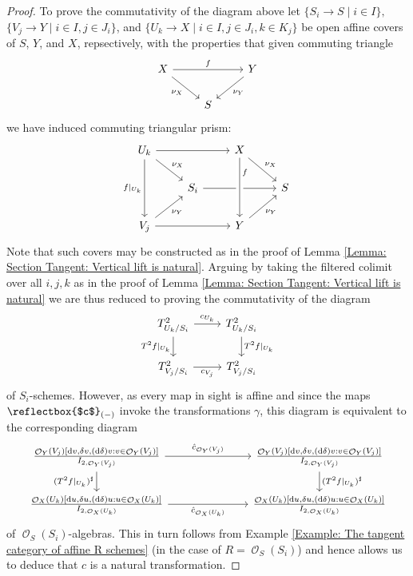 \documentclass{amsart}
\theoremstyle{definition}
\DeclareMathOperator{\Ocal}{\mathcal{O}}
\numberwithin{equation}{subsection}
\begin{document}
\begin{proof}
To prove the commutativity of the diagram above let $\lbrace S_i \to S \; | \; i \in I \rbrace,$ $\lbrace V_j \to Y \; | \; i \in I, j \in J_i\rbrace$, and $\lbrace U_k \to X \; | \; i \in I, j \in J_i, k \in K_j \rbrace$ be open affine covers of $S$, $Y$, and $X$, repsectively, with the properties that given commuting triangle
\[
\begin{tikzcd}
X \ar[rr]{}{f} \ar[dr, swap]{}{\nu_X} & & Y \ar[dl]{}{\nu_Y} \\
 & S
\end{tikzcd}
\]
we have induced commuting triangular prism:
\[
\begin{tikzcd}
	U_k \ar[dr]{}{\nu_X} \ar[rr] \ar[dd, swap]{}{f|_{U_k}} & & X  \ar[dr]{}{\nu_X} \\
	& S_i \ar[rr] & & S \\
	V_j \ar[rr] \ar[ur, swap]{}{\nu_Y} & & Y \ar[ur, swap]{}{\nu_Y}
	\ar[from = 1-3, to = 3-3, crossing over, near start]{}{f}
\end{tikzcd}
\]
Note that such covers may be constructed as in the proof of Lemma \ref{Lemma: Section Tangent: Vertical lift is natural}. Arguing by taking the filtered colimit over all $i, j, k$ as in the proof of Lemma \ref{Lemma: Section Tangent: Vertical lift is natural} we are thus reduced to proving the commutativity of the diagram
\[
\begin{tikzcd}
	T^{2}_{U_k/S_i} \ar[r]{}{c_{U_k}} \ar[d, swap]{}{T^2f|_{U_k}} & T^{2}_{U_k/S_i} \ar[d]{}{T^2f|_{U_k}} \\
	T^{2}_{V_j/S_i} \ar[r, swap]{}{c_{V_j}} & T^{2}_{V_j/S_i}
\end{tikzcd}
\]
of $S_i$-schemes. However, as every map in sight is affine and since the maps $\reflectbox{$c$}_{(-)}$ invoke the transformations $\gamma$, this diagram is equivalent to the corresponding diagram
\[
\begin{tikzcd}
\frac{\Ocal_Y(V_j)[\mathrm{d}v, \delta v, (\mathrm{d}\delta)v:v \in \Ocal_Y(V_j)]}{I_{2,\Ocal_Y(V_j)}} \ar[d, swap]{}{(T^2f|_{U_k})^{\sharp}} \ar[rrr]{}{\hat{c}_{\Ocal_Y(V_j)}} & & & \frac{\Ocal_Y(V_j)[\mathrm{d}v, \delta v, (\mathrm{d}\delta)v:v \in \Ocal_Y(V_j)]}{I_{2,\Ocal_Y(V_j)}} \ar[d]{}{(T^2f|_{U_k})^{\sharp}} \\
\frac{\Ocal_X(U_k)[\mathrm{d}u, \delta u, (\mathrm{d}\delta)u:u \in \Ocal_X(U_k)]}{I_{2,\Ocal_X(U_k)}} \ar[rrr, swap]{}{\hat{c}_{\Ocal_X(U_k)}} & & & \frac{\Ocal_X(U_k)[\mathrm{d}u, \delta u, (\mathrm{d}\delta)u:u \in \Ocal_X(U_k)]}{I_{2,\Ocal_X(U_k)}}
\end{tikzcd}
\]
of $\Ocal_S(S_i)$-algebras. This in turn follows from Example \ref{Example: The tangent category of affine R schemes} (in the case of $R = \Ocal_{S}(S_i)$) and hence allows us to deduce that $c$ is a natural transformation.
\end{proof}
\end{document}
